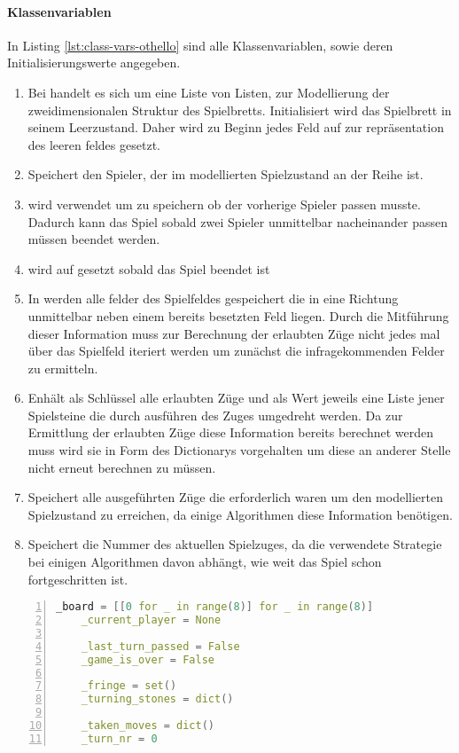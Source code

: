 \paragraph{Klassenvariablen}
In Listing \ref{lst:class-vars-othello} sind alle Klassenvariablen, sowie deren Initialisierungswerte angegeben.
\begin{enumerate}
\item[\code{\_board}] Bei  handelt es sich um eine Liste von Listen, zur Modellierung der zweidimensionalen Struktur des Spielbretts. Initialisiert wird das Spielbrett in seinem Leerzustand. Daher wird zu Beginn jedes Feld auf  zur repräsentation des leeren feldes gesetzt.
\item[\code{\_current\_player}] Speichert den Spieler, der im modellierten Spielzustand an der Reihe ist.
\item[\code{\_last\_turn\_passed}] wird verwendet um zu speichern ob der vorherige Spieler  passen musste. Dadurch kann das Spiel sobald zwei Spieler unmittelbar nacheinander passen müssen beendet werden.
\item[\code{\_game\_is\_over}] wird auf  gesetzt sobald das Spiel beendet ist
\item[\code{\_fringe}] In  werden alle felder des Spielfeldes gespeichert die in eine Richtung unmittelbar neben einem bereits besetzten Feld liegen. Durch die Mitführung dieser Information muss zur Berechnung der erlaubten Züge nicht jedes mal über das Spielfeld iteriert werden um zunächst die infragekommenden Felder zu ermitteln.
\item[\code{\_turning\_stones}] Enhält als Schlüssel alle erlaubten Züge und als Wert jeweils eine Liste jener Spielsteine die durch ausführen des Zuges umgedreht werden. Da zur Ermittlung der erlaubten Züge diese Information bereits berechnet werden muss wird sie in Form des Dictionarys vorgehalten um diese an anderer Stelle nicht erneut berechnen zu müssen.
\item[\code{\_taken\_moves}] Speichert alle ausgeführten Züge die erforderlich waren um den modellierten Spielzustand zu erreichen, da einige Algorithmen diese Information benötigen.
\item[\code{\_turn\_nr}] Speichert die Nummer des aktuellen Spielzuges, da die verwendete Strategie bei einigen Algorithmen davon abhängt, wie weit das Spiel schon fortgeschritten ist.
\end{enumerate}
\begin{lstlisting}[caption = {Klassenvariablen der Klasse \mxZitat{Othello}}, language = cpp, captionpos = t , numbers=left, label={lst:class-vars-othello}]
    _board = [[0 for _ in range(8)] for _ in range(8)]
    _current_player = None
 
    _last_turn_passed = False
    _game_is_over = False

    _fringe = set()
    _turning_stones = dict()
    
    _taken_moves = dict()
    _turn_nr = 0
\end{lstlisting}
